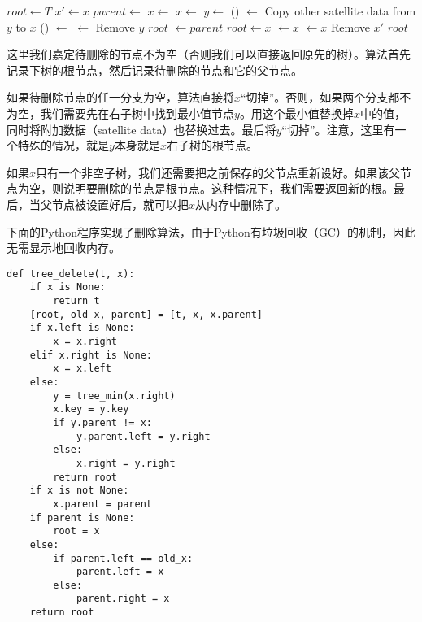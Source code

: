 \documentclass[UTF8]{article}
\begin{document}
\begin{algorithmic}[1]
  \State $root \gets T$
  \State $x' \gets x$ 
  \State $parent \gets $ 
    \State $x \gets $ 
    \State $x \gets $ 
  \Else
    \State  $y \gets $ ()
    \State {} $\gets$ 
    \State Copy other satellite data from $y$ to $x$
      \State {}() $\gets$ 
    \Else
      \State {} $\gets$ 
    \EndIf
    \State Remove $y$
    \State \Return $root$
  \EndIf
    \State {} $\gets parent$
  \EndIf
    \State $root \gets x$
  \Else
      \State {} $\gets x$
    \Else
      \State {} $\gets x$
    \EndIf
  \EndIf
  \State Remove $x'$
  \State \Return $root$
\EndFunction
\end{algorithmic}

这里我们嘉定待删除的节点不为空（否则我们可以直接返回原先的树）。算法首先记录下树的根节点，然后记录待删除的节点和它的父节点。

如果待删除节点的任一分支为空，算法直接将$x$“切掉”。否则，如果两个分支都不为空，我们需要先在右子树中找到最小值节点$y$。用这个最小值替换掉$x$中的值，同时将附加数据（satellite data）也替换过去。最后将$y$“切掉”。注意，这里有一个特殊的情况，就是$y$本身就是$x$右子树的根节点。

如果$x$只有一个非空子树，我们还需要把之前保存的父节点重新设好。如果该父节点为空，则说明要删除的节点是根节点。这种情况下，我们需要返回新的根。最后，当父节点被设置好后，就可以把$x$从内存中删除了。

下面的Python程序实现了删除算法，由于Python有垃圾回收（GC）的机制，因此无需显示地回收内存。

\lstset{language=Python}
\begin{lstlisting}
def tree_delete(t, x):
    if x is None:
        return t
    [root, old_x, parent] = [t, x, x.parent]
    if x.left is None:
        x = x.right
    elif x.right is None:
        x = x.left
    else:
        y = tree_min(x.right)
        x.key = y.key
        if y.parent != x:
            y.parent.left = y.right
        else:
            x.right = y.right
        return root
    if x is not None:
        x.parent = parent
    if parent is None:
        root = x
    else:
        if parent.left == old_x:
            parent.left = x
        else:
            parent.right = x
    return root
\end{lstlisting}
\end{document}
